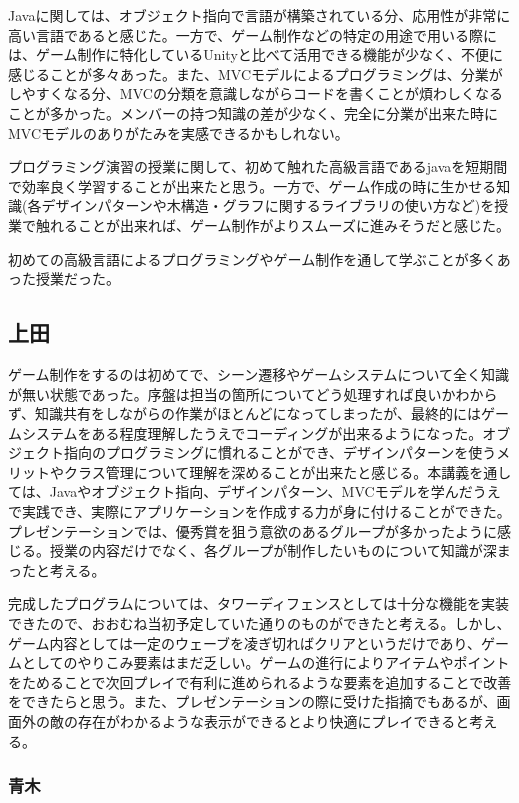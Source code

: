 \documentclass[11pt,a4j]{jarticle}
\begin{document}
Javaに関しては、オブジェクト指向で言語が構築されている分、応用性が非常に高い言語であると感じた。一方で、ゲーム制作などの特定の用途で用いる際には、ゲーム制作に特化しているUnityと比べて活用できる機能が少なく、不便に感じることが多々あった。また、MVCモデルによるプログラミングは、分業がしやすくなる分、MVCの分類を意識しながらコードを書くことが煩わしくなることが多かった。メンバーの持つ知識の差が少なく、完全に分業が出来た時にMVCモデルのありがたみを実感できるかもしれない。

プログラミング演習の授業に関して、初めて触れた高級言語であるjavaを短期間で効率良く学習することが出来たと思う。一方で、ゲーム作成の時に生かせる知識(各デザインパターンや木構造・グラフに関するライブラリの使い方など)を授業で触れることが出来れば、ゲーム制作がよりスムーズに進みそうだと感じた。

初めての高級言語によるプログラミングやゲーム制作を通して学ぶことが多くあった授業だった。

\subsection{上田}

ゲーム制作をするのは初めてで、シーン遷移やゲームシステムについて全く知識が無い状態であった。序盤は担当の箇所についてどう処理すれば良いかわからず、知識共有をしながらの作業がほとんどになってしまったが、最終的にはゲームシステムをある程度理解したうえでコーディングが出来るようになった。オブジェクト指向のプログラミングに慣れることができ、デザインパターンを使うメリットやクラス管理について理解を深めることが出来たと感じる。本講義を通しては、Javaやオブジェクト指向、デザインパターン、MVCモデルを学んだうえで実践でき、実際にアプリケーションを作成する力が身に付けることができた。プレゼンテーションでは、優秀賞を狙う意欲のあるグループが多かったように感じる。授業の内容だけでなく、各グループが制作したいものについて知識が深まったと考える。

完成したプログラムについては、タワーディフェンスとしては十分な機能を実装できたので、おおむね当初予定していた通りのものができたと考える。しかし、ゲーム内容としては一定のウェーブを凌ぎ切ればクリアというだけであり、ゲームとしてのやりこみ要素はまだ乏しい。ゲームの進行によりアイテムやポイントをためることで次回プレイで有利に進められるような要素を追加することで改善をできたらと思う。また、プレゼンテーションの際に受けた指摘でもあるが、画面外の敵の存在がわかるような表示ができるとより快適にプレイできると考える。

\subsubsection{青木}
\end{document}
